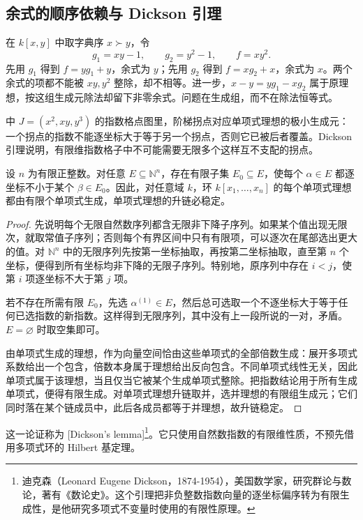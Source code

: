 \subsection{余式的顺序依赖与 Dickson 引理}
\label{b3:subsec:0801:03}

在 \(k[x,y]\) 中取字典序 \(x\succ y\)，令
\[
	g_1=xy-1,\qquad g_2=y^2-1,\qquad f=xy^2.
\]
先用 \(g_1\) 得到 \(f=yg_1+y\)，余式为 \(y\)；先用 \(g_2\) 得到 \(f=xg_2+x\)，余式为 \(x\)。两个余式的项都不能被 \(xy,y^2\) 整除，却不相等。进一步，\(x-y=yg_1-xg_2\) 属于原理想，按这组生成元除法却留下非零余式。问题在生成组，而不在除法恒等式。

中 \(J=(x^2,xy,y^3)\) 的指数格点图里，阶梯拐点对应单项式理想的极小生成元：一个拐点的指数不能逐坐标大于等于另一个拐点，否则它已被后者覆盖。Dickson 引理说明，有限维指数格子中不可能需要无限多个这样互不支配的拐点。

\begin{lemma}[Dickson]\label{b3:lem:dickson}
	设 \(n\) 为有限正整数。对任意 \(E\subseteq\mathbb N^n\)，存在有限子集 \(E_0\subseteq E\)，使每个 \(\alpha\in E\) 都逐坐标不小于某个 \(\beta\in E_0\)。因此，对任意域 \(k\)，环 \(k[x_1,\ldots,x_n]\) 的每个单项式理想都由有限个单项式生成，单项式理想的升链必稳定。
\end{lemma}
\begin{proof}
	先说明每个无限自然数序列都含无限非下降子序列。如果某个值出现无限次，就取常值子序列；否则每个有界区间中只有有限项，可以逐次在尾部选出更大的值。对 \(\mathbb N^n\) 中的无限序列先按第一坐标抽取，再按第二坐标抽取，直至第 \(n\) 个坐标，便得到所有坐标均非下降的无限子序列。特别地，原序列中存在 \(i<j\)，使第 \(i\) 项逐坐标不大于第 \(j\) 项。

	若不存在所需有限 \(E_0\)，先选 \(\alpha^{(1)}\in E\)，然后总可选取一个不逐坐标大于等于任何已选指数的新指数。这样得到无限序列，其中没有上一段所说的一对，矛盾。\(E=\varnothing\) 时取空集即可。

	由单项式生成的理想，作为向量空间恰由这些单项式的全部倍数生成：展开多项式系数给出一个包含，倍数本身属于理想给出反向包含。不同单项式线性无关，因此单项式属于该理想，当且仅当它被某个生成单项式整除。把指数结论用于所有生成单项式，便得有限生成。对单项式理想升链取并，选并理想的有限组生成元；它们同时落在某个链成员中，此后各成员都等于并理想，故升链稳定。
\end{proof}

这一论证称为 [Dickson's lemma]\footnote{迪克森（Leonard Eugene Dickson，1874-1954），美国数学家，研究群论与数论，著有《数论史》。这个引理把非负整数指数向量的逐坐标偏序转为有限生成性，是他研究多项式不变量时使用的有限性原理。}。它只使用自然数指数的有限维性质，不预先借用多项式环的 Hilbert 基定理。

